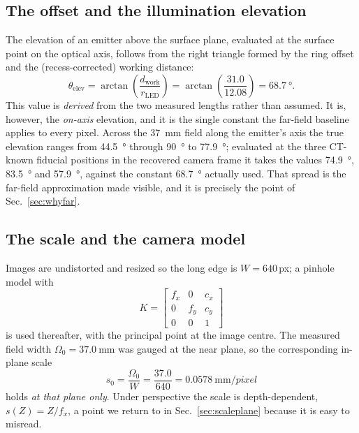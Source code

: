 \documentclass[journal,10pt]{IEEEtran}
\begin{document}
\subsection{The offset and the illumination elevation}
The elevation of an emitter above the surface plane, evaluated at the surface
point on the optical axis, follows from the right triangle formed by the ring
offset and the (recess-corrected) working distance:
\begin{equation}
\theta_\mathrm{elev}
= \arctan\!\left(\frac{d_\mathrm{work}}{r_\mathrm{LED}}\right)
= \arctan\!\left(\frac{31.0}{12.08}\right) = \SI{68.7}{\degree}.
\label{eq:elev}
\end{equation}
This value is \emph{derived} from the two measured lengths rather than assumed.
It is, however, the \emph{on-axis} elevation, and it is the single constant the
far-field baseline applies to every pixel. Across the \SI{37}{\milli\metre} field
along the emitter's axis the true elevation ranges from \SI{44.5}{\degree}
through \SI{90}{\degree} to \SI{77.9}{\degree}; evaluated at the three CT-known
fiducial positions in the recovered camera frame it takes the values
\SI{74.9}{\degree}, \SI{83.5}{\degree} and \SI{57.9}{\degree}, against the
constant \SI{68.7}{\degree} actually used. That spread is the far-field
approximation made visible, and it is precisely the point of
Sec.~\ref{sec:whyfar}.

\subsection{The scale and the camera model}
Images are undistorted and resized so the long edge is $W=\num{640}$\,px; a
pinhole model with
\begin{equation}
K = \begin{bmatrix} f_x & 0 & c_x \\ 0 & f_y & c_y \\ 0 & 0 & 1 \end{bmatrix}
\end{equation}
is used thereafter, with the principal point at the image centre. The measured
field width $\Omega_0=\SI{37.0}{\milli\metre}$ was gauged at the near plane, so
the corresponding in-plane scale
\begin{equation}
s_0 = \frac{\Omega_0}{W} = \frac{37.0}{640}
  = \SI{0.0578}{\milli\metre\per pixel}
\label{eq:scale}
\end{equation}
holds \emph{at that plane only}. Under perspective the scale is
depth-dependent, $s(Z) = Z/f_x$, a point we return to in
Sec.~\ref{sec:scaleplane} because it is easy to misread.
\end{document}
